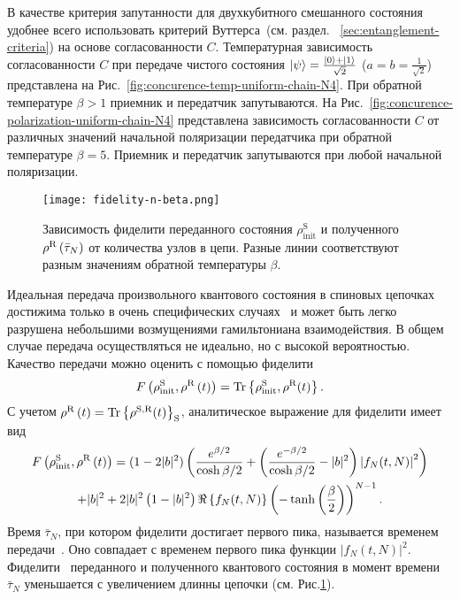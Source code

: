 В качестве критерия запутанности для двухкубитного смешанного состояния удобнее всего использовать критерий Вуттерса~(см. раздел. ~\ref{sec:entanglement-criteria}) на основе согласованности $C$.
Температурная зависимость согласованности $C$ при передаче чистого состояния $\left| \psi \right\rangle = \frac{\left| 0 \right\rangle + \left| 1 \right\rangle}{\sqrt{2}}$ ($a=b=\frac{1}{\sqrt{2}}$) представлена на Рис.~\ref{fig:concurence-temp-uniform-chain-N4}.
При обратной температуре $\beta > 1$ приемник и передатчик запутываются.
На Рис.~\ref{fig:concurence-polarization-uniform-chain-N4} представлена зависимость согласованности $C$ от различных значений начальной поляризации передатчика при обратной температуре $\beta = 5$.
Приемник и передатчик запутываются при любой начальной поляризации.

\begin{figure}[H]
    \centering
    \texttt{[image: fidelity-n-beta.png]}
    \caption{
      Зависимость фиделити переданного состояния
      $\rho^\mathrm{S}_\mathrm{init}$
      и полученного
      $\rho^\mathrm{R}\left( \bar\tau_N \right)$
      от количества узлов в цепи.
      Разные линии соответствуют разным значениям обратной температуры $\beta$.
     }
    \label{fig:fidelity-n-beta}
\end{figure}

Идеальная передача произвольного квантового состояния в спиновых цепочках достижима только в очень специфических случаях~\cite{Christandl2004, Karbach2005} и может быть легко разрушена небольшими возмущениями гамильтониана взаимодействия.
В общем случае передача осуществляться не идеально,
но с высокой вероятностью.
Качество передачи можно оценить с помощью фиделити~\cite{Jozsa1994}
%
\begin{equation}\label{generalFidelity}
  F\left( \rho^\mathrm{S}_\mathrm{init}, \rho^\mathrm{R}\left( t \right) \right)
  = \mathrm{Tr} \left\{ \rho^\mathrm{S}_\mathrm{init}, \rho^\mathrm{R}(t) \right\}.
\end{equation}
%
С учетом $\rho^\mathrm{R}\left( t \right) = \mathrm{Tr} \left\{ \rho^\mathrm{S,R}(t) \right\}_\mathrm{S}$,
аналитическое выражение для фиделити имеет вид
%
\begin{multline}\label{exactfidelity}
  F\left( \rho^\mathrm{S}_\mathrm{init}, \rho^\mathrm{R}\left( t \right) \right)
  = (1-2|b|^2)\left( 
    \frac{e^{\beta/2}}{\cosh \beta/2}
    + \left( \frac{e^{-\beta/2}}{\cosh \beta/2} -|b|^2  \right)
      \left|f_N(t, N)\right|^2
   \right) \\
  + |b|^2
  + 2 |b|^2 \left( 1-|b|^2 \right) \Re\left\{f_N(t, N)\right\}
  \left( -\tanh \left( \frac{\beta}{2} \right) \right)^{N-1}.
\end{multline}
%
Время $\bar\tau_{N}$, при котором фиделити достигает первого пика, называется временем передачи~\cite{Feldman2016}.
Оно совпадает с временем первого пика функции $\left|f_N(t, N)\right|^2$.
Фиделити~\cite{Jozsa1994} переданного и полученного квантового состояния в момент времени $\bar\tau_{N}$ уменьшается с увеличением длинны цепочки (см. Рис.\ref{fig:fidelity-n-beta}).


